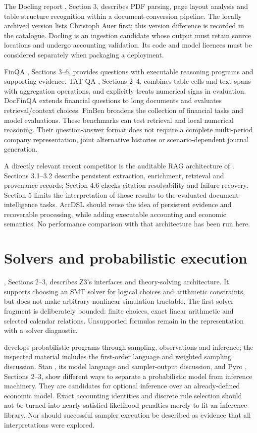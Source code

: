 The Docling report \citep{nassar2024}, Section 3, describes PDF parsing, page
layout analysis and table structure recognition within a document-conversion
pipeline. The locally archived version lists Christoph Auer first; this
version difference is recorded in the catalogue. Docling is an ingestion
candidate whose output must retain source locations and undergo accounting
validation. Its code and model licences must be considered separately when
packaging a deployment.

FinQA \citep{chen2021}, Sections 3--6, provides questions with executable
reasoning programs and supporting evidence. TAT-QA \citep{zhu2021}, Sections
2--4, combines table cells and text spans with aggregation operations, and
explicitly treats numerical signs in evaluation. DocFinQA \citep{reddy2024}
extends financial questions to long documents and evaluates retrieval/context
choices. FinBen \citep{xie2024} broadens the collection of financial tasks and
model evaluations. These benchmarks can test retrieval and local numerical
reasoning. Their question-answer format does not require a complete
multi-period company representation, joint alternative histories or
scenario-dependent journal generation.

A directly relevant recent competitor is the auditable RAG architecture of
\citet{cosentino2026}. Sections 3.1--3.2 describe persistent extraction,
enrichment, retrieval and provenance records; Section 4.6 checks citation
resolvability and failure recovery. Section 5 limits the interpretation of
those results to the evaluated document-intelligence tasks. AccDSL should
reuse the idea of persistent evidence and recoverable processing, while adding
executable accounting and economic semantics. No performance comparison with
that architecture has been run here.

\section{Solvers and probabilistic execution}

\citet{damoura2008}, Sections 2--3, describes Z3's interfaces and theory-solving
architecture. It supports choosing an SMT solver for logical choices and
arithmetic constraints, but does not make arbitrary nonlinear simulation
tractable. The first solver fragment is deliberately bounded: finite choices,
exact linear arithmetic and selected calendar relations. Unsupported formulas
remain in the representation with a solver diagnostic.

\citet{vandeMeent2018} develops probabilistic programs through sampling,
observations and inference; the inspected material includes the first-order
language and weighted sampling discussion. Stan \citep{carpenter2017}, its
model language and sampler-output discussion, and Pyro \citep{bingham2019},
Sections 2--3, show different ways to separate a probabilistic model from
inference machinery. They are candidates for optional inference over an
already-defined economic model. Exact accounting identities and discrete rule
selection should not be turned into nearly satisfied likelihood penalties
merely to fit an inference library. Nor should successful sampler execution
be described as evidence that all interpretations were explored.

